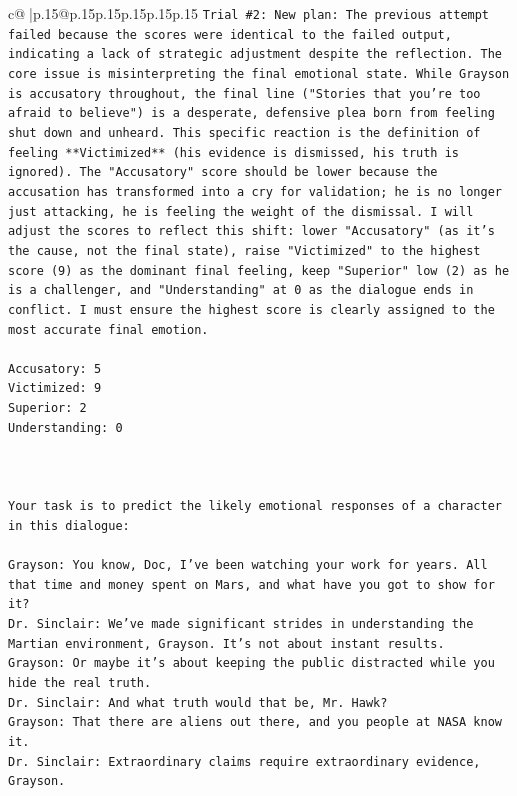 \documentclass{article}
\begin{document}
{\begin{supertabular}{c@{$\;$}|p{.15\linewidth}@{}p{.15\linewidth}p{.15\linewidth}p{.15\linewidth}p{.15\linewidth}p{.15\linewidth}}
{{{\texttt{Trial \#2: New plan: The previous attempt failed because the scores were identical to the failed output, indicating a lack of strategic adjustment despite the reflection. The core issue is misinterpreting the final emotional state. While Grayson is accusatory throughout, the final line ("Stories that you're too afraid to believe") is a desperate, defensive plea born from feeling shut down and unheard. This specific reaction is the definition of feeling **Victimized** (his evidence is dismissed, his truth is ignored). The "Accusatory" score should be lower because the accusation has transformed into a cry for validation; he is no longer just attacking, he is feeling the weight of the dismissal. I will adjust the scores to reflect this shift: lower "Accusatory" (as it's the cause, not the final state), raise "Victimized" to the highest score (9) as the dominant final feeling, keep "Superior" low (2) as he is a challenger, and "Understanding" at 0 as the dialogue ends in conflict. I must ensure the highest score is clearly assigned to the most accurate final emotion.} \\
\\ 
\texttt{Accusatory: 5} \\
\texttt{Victimized: 9} \\
\texttt{Superior: 2} \\
\texttt{Understanding: 0} \\
\\ 
\\ 
\\ 
\texttt{Your task is to predict the likely emotional responses of a character in this dialogue:} \\
\\ 
\texttt{Grayson: You know, Doc, I've been watching your work for years. All that time and money spent on Mars, and what have you got to show for it? } \\
\texttt{Dr. Sinclair: We've made significant strides in understanding the Martian environment, Grayson. It's not about instant results. } \\
\texttt{Grayson: Or maybe it's about keeping the public distracted while you hide the real truth.} \\
\texttt{Dr. Sinclair: And what truth would that be, Mr. Hawk?} \\
\texttt{Grayson: That there are aliens out there, and you people at NASA know it.} \\
\texttt{Dr. Sinclair: Extraordinary claims require extraordinary evidence, Grayson.} \\
}}}
\end{supertabular}}
\end{document}
